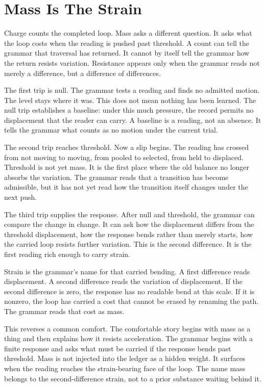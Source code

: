 \section{Mass Is The Strain}

Charge counts the completed loop. Mass asks a different question. It asks
what the loop costs when the reading is pushed past threshold. A count can
tell the grammar that traversal has returned. It cannot by itself tell the
grammar how the return resists variation. Resistance appears only when the
grammar reads not merely a difference, but a difference of differences.

The first trip is null. The grammar tests a reading and finds no admitted
motion. The level stays where it was. This does not mean nothing has been
learned. The null trip establishes a baseline: under this much pressure, the
record permits no displacement that the reader can carry. A baseline is a
reading, not an absence. It tells the grammar what counts as no motion under
the current trial.

The second trip reaches threshold. Now a slip begins. The reading has crossed
from not moving to moving, from pooled to selected, from held to displaced.
Threshold is not yet mass. It is the first place where the old balance no
longer absorbs the variation. The grammar reads that a transition has become
admissible, but it has not yet read how the transition itself changes under
the next push.

The third trip supplies the response. After null and threshold, the grammar
can compare the change in change. It can ask how the displacement differs
from the threshold displacement, how the response bends rather than merely
starts, how the carried loop resists further variation. This is the second
difference. It is the first reading rich enough to carry strain.

Strain is the grammar's name for that carried bending. A first difference
reads displacement. A second difference reads the variation of displacement.
If the second difference is zero, the response has no readable bend at this
scale. If it is nonzero, the loop has carried a cost that cannot be erased by
renaming the path. The grammar reads that cost as mass.

This reverses a common comfort. The comfortable story begins with mass as a
thing and then explains how it resists acceleration. The grammar begins with
a finite response and asks what must be carried if the response bends past
threshold. Mass is not injected into the ledger as a hidden weight. It
surfaces when the reading reaches the strain-bearing face of the loop. The
name mass belongs to the second-difference strain, not to a prior substance
waiting behind it.

